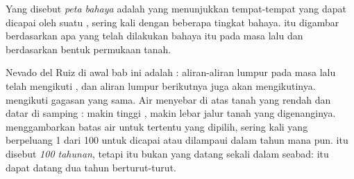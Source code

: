 \begin{definition}\label{def:g9:natural-risks:hazard-map}
Yang disebut \emph{peta bahaya} adalah  yang
menunjukkan tempat-tempat yang dapat dicapai oleh suatu ,
sering kali dengan beberapa tingkat bahaya.  itu digambar berdasarkan
apa yang telah dilakukan bahaya itu pada masa lalu dan berdasarkan bentuk
permukaan tanah.
\end{definition}

 Nevado del Ruiz di awal bab ini adalah : aliran-aliran
lumpur pada masa lalu telah mengikuti , dan aliran lumpur
berikutnya juga akan mengikutinya.   mengikuti gagasan yang
sama. Air menyebar di atas tanah yang rendah dan datar di samping :
makin tinggi , makin lebar jalur tanah yang digenanginya. 
 menggambarkan batas air untuk  tertentu yang dipilih, sering
kali  yang berpeluang 1 dari 100 untuk dicapai atau dilampaui dalam
tahun mana pun.  itu disebut \emph{ 100 tahunan}, tetapi
 itu bukan  yang datang sekali dalam seabad:  itu dapat
datang dua tahun berturut-turut.

